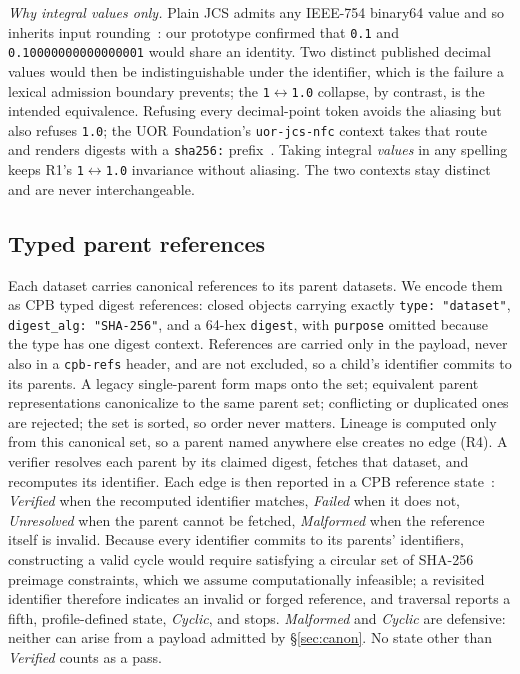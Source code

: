 \documentclass[conference]{IEEEtran}
\begin{document}
\emph{Why integral values only.} Plain JCS admits any IEEE-754 binary64 value and so inherits input rounding~\cite{rfc8785}: our prototype confirmed that \texttt{0.1} and \texttt{0.10000000000000001} would share an identity. Two distinct published decimal values would then be indistinguishable under the identifier, which is the failure a lexical admission boundary prevents; the \texttt{1}$\leftrightarrow$\texttt{1.0} collapse, by contrast, is the intended equivalence. Refusing every decimal-point token avoids the aliasing but also refuses \texttt{1.0}; the UOR Foundation's \texttt{uor-jcs-nfc} context takes that route and renders digests with a \texttt{sha256:} prefix~\cite{uorjcsnfc}. Taking integral \emph{values} in any spelling keeps R1's \texttt{1}$\leftrightarrow$\texttt{1.0} invariance without aliasing. The two contexts stay distinct and are never interchangeable.

\subsection{Typed parent references}\label{sec:parents}
Each dataset carries canonical references to its parent datasets. We encode them as CPB typed digest references: closed objects carrying exactly \texttt{type: "dataset"}, \texttt{digest\_alg: "SHA-256"}, and a 64-hex \texttt{digest}, with \texttt{purpose} omitted because the type has one digest context. References are carried only in the payload, never also in a \texttt{cpb-refs} header, and are not excluded, so a child's identifier commits to its parents. A legacy single-parent form maps onto the set; equivalent parent representations canonicalize to the same parent set; conflicting or duplicated ones are rejected; the set is sorted, so order never matters. Lineage is computed only from this canonical set, so a parent named anywhere else creates no edge (R4). A verifier resolves each parent by its claimed digest, fetches that dataset, and recomputes its identifier. Each edge is then reported in a CPB reference state~\cite{cpb03}: \emph{Verified} when the recomputed identifier matches, \emph{Failed} when it does not, \emph{Unresolved} when the parent cannot be fetched, \emph{Malformed} when the reference itself is invalid. Because every identifier commits to its parents' identifiers, constructing a valid cycle would require satisfying a circular set of SHA-256 preimage constraints, which we assume computationally infeasible; a revisited identifier therefore indicates an invalid or forged reference, and traversal reports a fifth, profile-defined state, \emph{Cyclic}, and stops. \emph{Malformed} and \emph{Cyclic} are defensive: neither can arise from a payload admitted by \S\ref{sec:canon}. No state other than \emph{Verified} counts as a pass.
\end{document}

